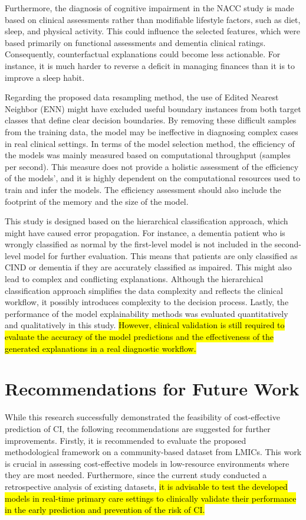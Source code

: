 Furthermore, the diagnosis of cognitive impairment in the NACC study is made based on clinical assessments rather than modifiable lifestyle factors, such as diet, sleep, and physical activity. This could influence the selected features, which were based primarily on functional assessments and dementia clinical ratings. Consequently, counterfactual explanations could become less actionable. For instance, it is much harder to reverse a deficit in managing finances than it is to improve a sleep habit.

Regarding the proposed data resampling method, the use of Edited Nearest Neighbor (\acrshort{ENN}) might have excluded useful boundary instances from both target classes that define clear decision boundaries. By removing these difficult samples from the training data, the model may be ineffective in diagnosing complex cases in real clinical settings. In terms of the model selection method, the efficiency of the models was mainly measured based on computational throughput (samples per second). This measure does not provide a holistic assessment of the efficiency of the models', and it is highly dependent on the computational resources used to train and infer the models. The efficiency assessment should also include the footprint of the memory and the size of the model.

This study is designed based on the hierarchical classification approach, which might have caused error propagation. For instance, a dementia patient who is wrongly classified as normal by the first-level model is not included in the second-level model for further evaluation. This means that patients are only classified as CIND or dementia if they are accurately classified as impaired. This might also lead to complex and conflicting explanations. Although the hierarchical classification approach simplifies the data complexity and reflects the clinical workflow, it possibly introduces complexity to the decision process. Lastly, the performance of the model explainability methods was evaluated quantitatively and qualitatively in this study. \hl{However, clinical validation is still required to evaluate the accuracy of the model predictions and the effectiveness of the generated explanations in a real diagnostic workflow.}

\section{Recommendations for Future Work}
While this research successfully demonstrated the feasibility of cost-effective prediction of CI, the following recommendations are suggested for further improvements. Firstly, it is recommended to evaluate the proposed methodological framework on a community-based dataset from LMICs. This work is crucial in assessing cost-effective models in low-resource environments where they are most needed. Furthermore, since the current study conducted a retrospective analysis of existing datasets, \hl{it is advisable to test the developed models in real-time primary care settings to clinically validate their performance in the early prediction and prevention of the risk of CI.}

